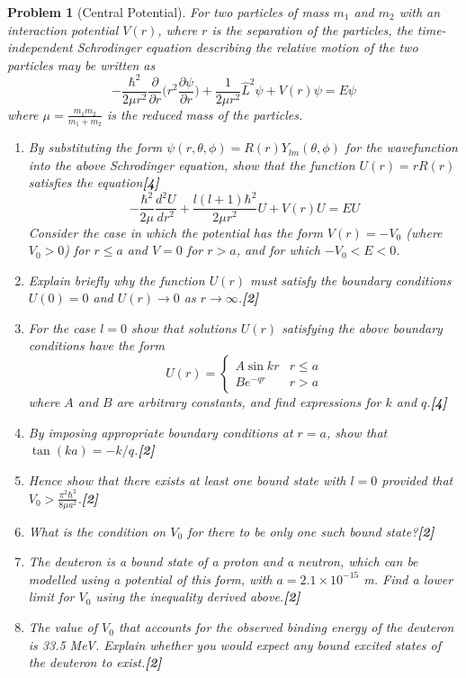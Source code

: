 \documentclass[a4paper]{article}
\theoremstyle{new}
\newtheorem{qns}{Problem}[subsection]
\begin{document}
\begin{qns}[Central Potential]
For two particles of mass $m_1$ and $m_2$ with an interaction potential $V(r)$, where $r$ is the separation of the particles, the time-independent Schrodinger equation describing the relative motion of the two particles may be written as
$$-\frac{\hbar^2}{2\mu r^2}\frac{\partial}{\partial r}\bigg(r^2\frac{\partial\psi}{\partial r}\bigg)+\frac{1}{2\mu r^2}\hat{L}^2\psi+V(r)\psi=E\psi$$
where $\mu=\frac{m_1m_2}{m_1+m_2}$ is the reduced mass of the particles.
\begin{enumerate}[label=(\roman*)]
\item By substituting the form $\psi(r,\theta,\phi)=R(r)Y_{lm}(\theta,\phi)$ for the wavefunction into the above Schrodinger equation, show that the function $U(r)=rR(r)$ satisfies the equation\hfill\textbf{[4]}
$$-\frac{\hbar^2}{2\mu}\frac{d^2U}{dr^2}+\frac{l(l+1)\hbar^2}{2\mu r^2}U+V(r)U=EU$$
Consider the case in which the potential has the form $V(r) = -V_0$ (where $V_0 > 0$) for $r\leq a$ and $V = 0$ for $r > a$, and for which $-V_0<E<0$.
\item Explain briefly why the function $U(r)$ must satisfy the boundary conditions $U(0) = 0$ and $U(r)\rightarrow0$ as $r\rightarrow\infty$.\hfill\textbf{[2]}
\item For the case $l=0$ show that solutions $U(r)$ satisfying the above boundary conditions have the form 
$$U(r)=
\left\{
        \begin{array}{ll}
      A\sin kr & r\leq a\\
      Be^{-qr} & r>a
        \end{array}
    \right.$$ 
where $A$ and $B$ are arbitrary constants, and find expressions for $k$ and $q$.\hfill\textbf{[4]}
\item By imposing appropriate boundary conditions at $r = a$, show that $\tan(ka)=-k/q$.\hfill\textbf{[2]}
\item Hence show that there exists at least one bound state with $l=0$ provided that $V_0>\frac{\pi^2\hbar^2}{8\mu a^2}$.\hfill\textbf{[2]} 
\item  What is the condition on $V_0$ for there to be only one such bound state?\hfill\textbf{[2]}
\item The deuteron is a bound state of a proton and a neutron, which can be modelled using a potential of this form, with $a=2.1\times10^{-15}$ m. Find a lower limit for $V_0$ using the
inequality derived above.\hfill\textbf{[2]}
\item The value of $V_0$ that accounts for the observed binding energy of the deuteron is 33.5 MeV. Explain whether you would expect any bound excited states of the deuteron to exist.\hfill\textbf{[2]}
\end{enumerate}
\end{qns}
\end{document}

